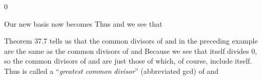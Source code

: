 \documentclass[11pt,oneside]{article}
\begin{document}
\begin{BookBody}
0

\noindent Our new basis  now becomes  Thus   and we see that \BookEnd{\blacktriangle}

Theorem 37.7 tells us that the common divisors of  and  in the preceding example are the same as the common divisors of  and  Because  we see that  itself divides 0, so the common divisors of  and  are just those of  which, of course, include  itself. Thus  is called a “\textit{greatest common} \textit{divisor}” (abbreviated gcd) of  and 

\end{BookBody}

\BookNarrativefalse
\end{document}
